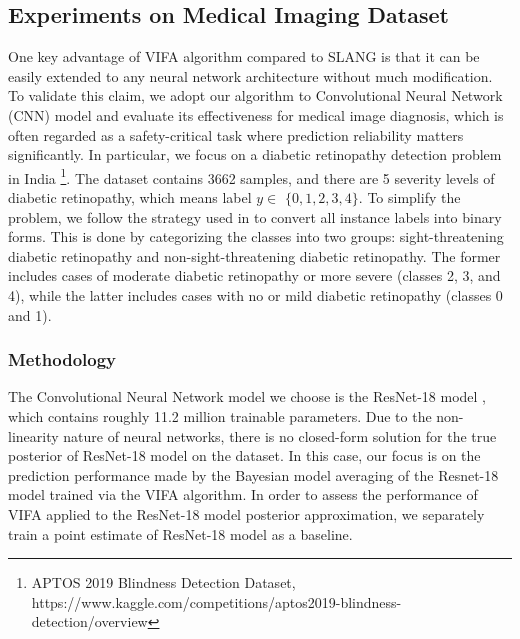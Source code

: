 \documentclass[10pt]{article} %
\begin{document}
\subsection{Experiments on Medical Imaging Dataset}

One key advantage of VIFA algorithm compared to SLANG is that it can be easily extended to any neural network architecture without much modification. To validate this claim, we adopt our algorithm to Convolutional Neural Network (CNN) model and evaluate its effectiveness for medical image diagnosis, which is often regarded as a safety-critical task where prediction reliability matters significantly. In particular, we focus on a diabetic retinopathy detection problem in India \footnote{APTOS 2019 Blindness Detection Dataset, https://www.kaggle.com/competitions/aptos2019-blindness-detection/overview}. The dataset contains 3662 samples, and there are 5 severity levels of diabetic retinopathy, which means label $y \in$ $\{0,1,2,3,4\}$. To simplify the problem, we follow the strategy used in \citet{leibig2017leveraging} to convert all instance labels into binary forms. This is done by categorizing the classes into two groups: sight-threatening diabetic retinopathy and non-sight-threatening diabetic retinopathy. The former includes cases of moderate diabetic retinopathy or more severe (classes 2, 3, and 4), while the latter includes cases with no or mild diabetic retinopathy (classes 0 and 1).

\subsubsection{Methodology}

The Convolutional Neural Network model we choose is the ResNet-18 model \citep{he2016deep}, which contains roughly 11.2 million trainable parameters. Due to the non-linearity nature of neural networks, there is no closed-form solution for the true posterior of ResNet-18 model on the dataset. In this case, our focus is on the prediction performance made by the Bayesian model averaging of the Resnet-18 model trained via the VIFA algorithm. In order to assess the performance of VIFA applied to the ResNet-18 model posterior approximation, we separately train a point estimate of ResNet-18 model as a baseline.
\end{document}
